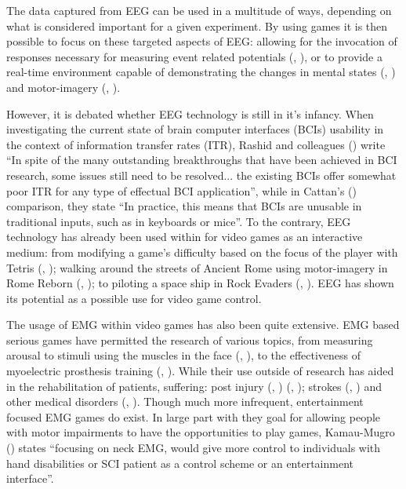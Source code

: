 \documentclass[11pt, a4paper]{article}
\newcommand{\ccite}[1]{(\citeauthor{#1}, \citeyear{#1})}
\newcommand{\cciteyear}[1]{(\citeyear{#1})}
\begin{document}
The data captured from EEG can be used in a multitude of ways, depending on what is considered important for a given experiment. By using games it is then possible to focus on these targeted aspects of EEG: allowing for the invocation of responses necessary for measuring event related potentials \ccite{ahn2011using}, or to provide a real-time environment capable of demonstrating the changes in mental states \ccite{liarokapis2015examining} and motor-imagery \ccite{ndulue2019driving}. 

However, it is debated whether EEG technology is still in it's infancy. When investigating the current state of brain computer interfaces (BCIs) usability in the context of information transfer rates (ITR), Rashid and colleagues \cciteyear{rashid2020current} write ``In spite of the many outstanding breakthroughs that have been achieved in BCI research, some issues still need to be resolved... the existing BCIs offer somewhat poor ITR for any type of effectual BCI application'', while in Cattan's \cciteyear{cattan2021use} comparison, they state ``In practice, this means that BCIs are unusable in traditional inputs, such as in keyboards or mice''. To the contrary, EEG technology has already been used within for video games as an interactive medium: from modifying a game's difficulty based on the focus of the player with Tetris \ccite{liarokapis2015examining}; walking around the streets of Ancient Rome using motor-imagery in Rome Reborn \ccite{ndulue2019driving}; to piloting a space ship in Rock Evaders \ccite{ndulue2019driving}. EEG has shown its potential as a possible use for video game control.

\hfill

The usage of EMG within video games has also been quite extensive. EMG based serious games have permitted the research of various topics, from measuring arousal to stimuli using the muscles in the face \ccite{schuurink2008engagement}, to the effectiveness of myoelectric prosthesis training \ccite{bessa2020designing}. While their use outside of research has aided in the rehabilitation of patients, suffering: post injury \ccite{gutierrez2020serious} \ccite{schonauer2011full}; strokes \ccite{ghassemi2019development} and other medical disorders \ccite{labruyere2013requirements}. Though much more infrequent, entertainment focused EMG games do exist. In large part with they goal for allowing people with motor impairments to have the opportunities to play games, Kamau-Mugro \cciteyear{muguro2020development} states ``focusing on neck EMG, would give more control to individuals with hand disabilities or SCI patient as a control scheme or an entertainment interface''.
\end{document}
